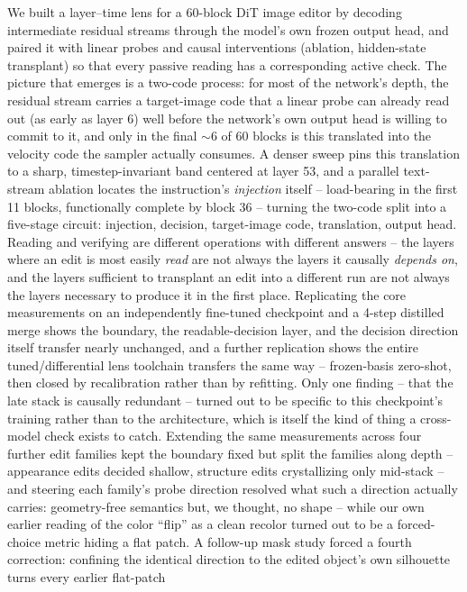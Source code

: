 \documentclass[10pt,twocolumn]{article}
\begin{document}
We built a layer--time lens for a 60-block DiT image editor by decoding
intermediate residual streams through the model's own frozen output
head, and paired it with linear probes and causal interventions
(ablation, hidden-state transplant) so that every passive reading has a
corresponding active check. The picture that emerges is a two-code
process: for most of the network's depth, the residual stream carries a
target-image code that a linear probe can already read out (as early as
layer 6) well before the network's own output head is willing to commit
to it, and only in the final $\sim$6 of 60 blocks is this translated
into the velocity code the sampler actually consumes. A denser sweep
pins this translation to a sharp, timestep-invariant band centered at
layer 53, and a parallel text-stream ablation locates the instruction's
\emph{injection} itself -- load-bearing in the first 11 blocks,
functionally complete by block 36 -- turning the two-code split into a
five-stage circuit: injection, decision, target-image code, translation,
output head. Reading and verifying are different operations with
different answers -- the layers where an edit is most easily \emph{read}
are not always the layers it causally \emph{depends on}, and the layers
sufficient to transplant an edit into a different run are not always the
layers necessary to produce it in the first place. Replicating the core
measurements on an independently fine-tuned checkpoint and a 4-step
distilled merge shows the boundary, the readable-decision layer, and the
decision direction itself transfer nearly unchanged, and a further
replication shows the entire tuned/differential lens toolchain transfers
the same way -- frozen-basis zero-shot, then closed by recalibration
rather than by refitting. Only one finding --
that the late stack is causally redundant -- turned out to be specific to
this checkpoint's training rather than to the architecture, which is
itself the kind of thing a cross-model check exists to catch. Extending
the same measurements across four further edit families kept the
boundary fixed but split the families along depth -- appearance edits
decided shallow, structure edits crystallizing only mid-stack -- and
steering each family's probe direction resolved what such a direction
actually carries: geometry-free semantics but, we thought, no shape --
while our own earlier reading of the color ``flip'' as a clean recolor
turned out to be a forced-choice metric hiding a flat patch. A follow-up
mask study forced a fourth correction: confining the identical direction
to the edited object's own silhouette turns every earlier flat-patch
\end{document}
